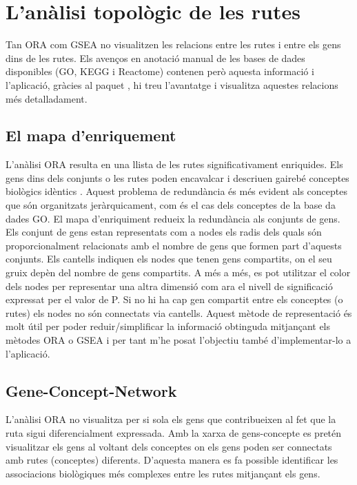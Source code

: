 \section{L'anàlisi topològic de les rutes}
Tan \gls{ORA} com \gls{GSEA} no visualitzen les relacions entre les rutes i entre els gens dins de les rutes. Els avenços en anotació manual de les bases de dades disponibles (\gls{GO}, \gls{KEGG} i Reactome) contenen però aquesta informació i l'aplicació, gràcies al paquet , hi treu l'avantatge i visualitza aquestes relacions més detalladament. 

\subsection{El mapa d'enriquement}

L’anàlisi \gls{ORA} resulta en una llista de les rutes significativament  enriquides. Els gens dins dels conjunts o les rutes poden encavalcar i descriuen gairebé conceptes biològics idèntics \cite{merico2010enrichment}. Aquest problema de redundància és més evident als conceptes que són organitzats jeràrquicament, com és el cas dels conceptes de la base da dades \gls{GO}.  El mapa d’enriquiment redueix la redundància als conjunts de gens. Els conjunt de gens estan representats com a nodes els radis dels quals són proporcionalment relacionats amb el nombre de gens que formen part d’aquests conjunts. Els cantells indiquen els nodes que tenen gens compartits, on el seu gruix depèn del nombre de gens compartits. A més a més, es pot utilitzar el color dels nodes per representar una altra dimensió com ara el nivell de significació expressat per el valor de P. Si no hi ha cap gen compartit entre els conceptes (o rutes) els nodes no són connectats via  cantells. Aquest mètode de representació és molt útil per poder reduir/simplificar la informació obtinguda mitjançant els mètodes \gls{ORA} o \gls{GSEA} i per tant m’he posat l’objectiu també d’implementar-lo a l’aplicació. 

\subsection{\gls{Gene-Concept-Network}}

L'anàlisi \gls{ORA} no visualitza per si sola els gens que contribueixen al fet que la ruta sigui diferencialment expressada. Amb la xarxa de gens-concepte es pretén visualitzar els gens al voltant dels conceptes on els gens poden ser connectats amb rutes (conceptes) diferents. D'aquesta manera es fa possible identificar les associacions biològiques més complexes entre les rutes mitjançant els gens. 

